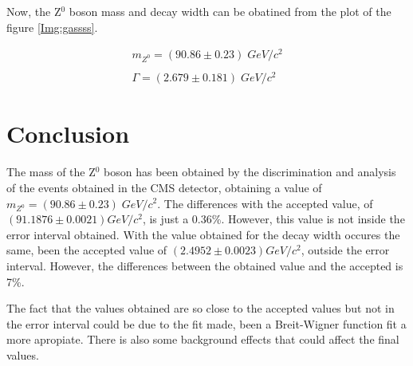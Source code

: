 \documentclass[twoside]{article}
\begin{document}
\begin{multicols}{2}
			Now, the Z$^0$ boson mass and decay width can be obatined from the plot of the figure \ref{Img:gassss}.

				\begin{equation}
					\begin{matrix}
						m_{Z^0} = ( 90.86 \pm 0.23 ) \; GeV/c^2
						\\
						\\
						\Gamma = ( 2.679 \pm 0.181 ) \; GeV/c^2
					\end{matrix}
				\end{equation}

		\section{Conclusion}

			The mass of the Z$^0$ boson has been obtained by the discrimination and analysis of the events obtained in the CMS detector, obtaining a value of $m_{Z^0} = ( 90.86 \pm 0.23 ) \; GeV/c^2$. The differences with the accepted value, of $( 91.1876 \pm 0.0021 ) GeV/c^2$, is just a 0.36\%. However, this value is not inside the error interval obtained. With the value obtained for the decay width occures the same, been the accepted value of $(2.4952 \pm 0.0023) GeV/c^2$, outside the error interval. However, the differences between the obtained value and the accepted is 7\%.

			The fact that the values obtained are so close to the accepted values but not in the error interval could be due to the fit made, been a Breit-Wigner function fit a more apropiate. There is also some background effects that could affect the final values.

	\end{multicols}



	    		

\end{document}
